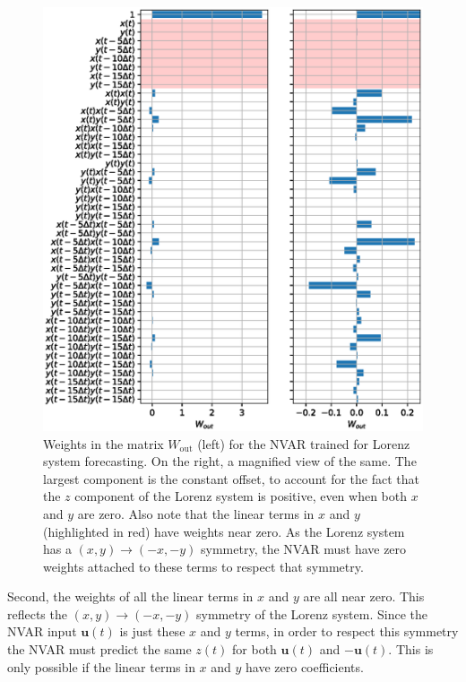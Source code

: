 \begin{figure}
  \includegraphics[width=\textwidth]{figures/nvar-infer-lorenz-wout}
  \caption{Weights in the matrix $W_\text{out}$ (left) for the NVAR
    trained for Lorenz system forecasting. On the right, a magnified
    view of the same. The largest component is the constant offset, to
    account for the fact that the $z$ component of the Lorenz system
    is positive, even when both $x$ and $y$ are zero. Also note that
    the linear terms in $x$ and $y$ (highlighted in red) have weights near zero. As the
    Lorenz system has a $(x, y) \rightarrow (-x, -y)$ symmetry, the
    NVAR must have zero weights attached to these terms to respect
    that symmetry.}
  \label{fig:nvar-infer-lorenz-wout}
\end{figure}

Second, the weights of all the linear terms in $x$ and $y$ are all
near zero. This reflects the $(x, y) \rightarrow (-x, -y)$ symmetry of
the Lorenz system. Since the NVAR input $\bm{u}(t)$ is just these $x$
and $y$ terms, in order to respect this symmetry the NVAR must predict
the same $z(t)$ for both $\bm{u}(t)$ and $-\bm{u}(t)$. This is only
possible if the linear terms in $x$ and $y$ have zero coefficients.

